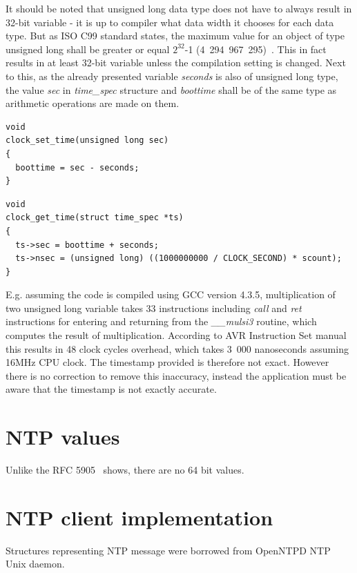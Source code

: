 It should be noted that unsigned long data type does not have to always result in 32-bit variable -
it is up to compiler what data width it chooses for each data type.
But as ISO C99 standard states, the maximum value for an object of type unsigned long
shall be greater or equal $2^{32}$-1 (4~294~967~295)~\cite{c99}.
This in fact results in at least 32-bit variable unless the compilation setting is changed.
Next to this, as the already presented variable {\it{seconds}} is also of unsigned long type,
the value {\it{sec}} in {\it{time\_spec}} structure and {\it{boottime}}
shall be of the same type as arithmetic operations are made on them.

\begin{lstlisting}
void
clock_set_time(unsigned long sec)
{
  boottime = sec - seconds;
}
\end{lstlisting}

\begin{lstlisting}
void
clock_get_time(struct time_spec *ts)
{
  ts->sec = boottime + seconds;
  ts->nsec = (unsigned long) ((1000000000 / CLOCK_SECOND) * scount);
}
\end{lstlisting}
E.g. assuming the code is compiled using GCC version 4.3.5,
multiplication of two unsigned long variable takes 33 instructions including {\it{call}} and {\it{ret}}
instructions for entering and returning from the {\it{\_\_mulsi3}} routine, which computes
the result of multiplication.
According to AVR Instruction Set manual~\cite{avr-instruction-set} this results in 48 clock cycles overhead,
which takes 3~000 nanoseconds assuming 16MHz CPU clock.
The timestamp provided is therefore not exact.
However there is no correction to remove this inaccuracy,
instead the application must be aware that the timestamp is not exactly accurate.


\section{NTP values}
Unlike the RFC 5905~\cite{rfc5905} shows, there are no 64 bit values. %


\section{NTP client implementation}
Structures representing NTP message were borrowed from OpenNTPD NTP Unix daemon.

